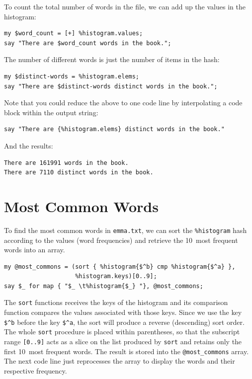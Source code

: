 To count the total number of words in the file, we can add up
the values in the histogram:

\begin{verbatim}
my $word_count = [+] %histogram.values;
say "There are $word_count words in the book.";
\end{verbatim}
%
The number of different words is just the number of items in
the hash:

\begin{verbatim}
my $distinct-words = %histogram.elems;
say "There are $distinct-words distinct words in the book.";
\end{verbatim}
%
Note that you could reduce the above to one code line by 
interpolating a code block within the output string:

\begin{verbatim}
say "There are {%histogram.elems} distinct words in the book."
\end{verbatim}
%
And the results:

\begin{verbatim}
There are 161991 words in the book.
There are 7110 distinct words in the book.
\end{verbatim}
%


\section{Most Common Words}
\label{most_common_words}

To find the most common words in \verb'emma.txt', we can 
sort the \verb'%histogram' hash according to the values 
(word frequencies) and retrieve the 10~most frequent words 
into an array.

\begin{verbatim}
my @most_commons = (sort { %histogram{$^b} cmp %histogram{$^a} }, 
                    %histogram.keys)[0..9];
say $_ for map { "$_ \t%histogram{$_} "}, @most_commons;
\end{verbatim}

The {\tt sort} functions receives the keys of the histogram and 
its comparison function compares the values associated with 
those keys. Since we use the key \verb'$^b' before the key 
\verb'$^a', the sort will produce a reverse (descending) sort 
order. The whole {\tt sort} procedure is placed within parentheses, 
so that the subscript range {\tt [0..9]} acts as a slice on 
the list produced by {\tt sort} and retains only the first 10~most 
frequent words. The result is stored into the 
\verb'@most_commons' array. The next code line just reprocesses 
the array to display the words and their respective frequency.

